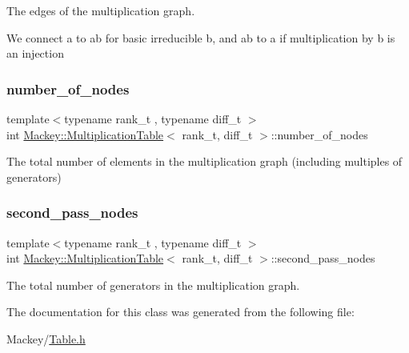 The edges of the multiplication graph. 

We connect a to ab for basic irreducible b, and ab to a if multiplication by b is an injection \mbox{\label{classMackey_1_1MultiplicationTable_a224de8ffa6d10b7d9511880bb8a2260f}} 
\subsubsection{\texorpdfstring{number\+\_\+of\+\_\+nodes}{number\_of\_nodes}}
{\footnotesize\ttfamily template$<$typename rank\+\_\+t , typename diff\+\_\+t $>$ \\
int \hyperlink{classMackey_1_1MultiplicationTable}{Mackey\+::\+Multiplication\+Table}$<$ rank\+\_\+t, diff\+\_\+t $>$\+::number\+\_\+of\+\_\+nodes\hspace{0.3cm}{\ttfamily [protected]}}



The total number of elements in the multiplication graph (including multiples of generators) 

\mbox{\label{classMackey_1_1MultiplicationTable_a0c2fa316e3b79691a73a69e552a52bfc}} 
\subsubsection{\texorpdfstring{second\+\_\+pass\+\_\+nodes}{second\_pass\_nodes}}
{\footnotesize\ttfamily template$<$typename rank\+\_\+t , typename diff\+\_\+t $>$ \\
int \hyperlink{classMackey_1_1MultiplicationTable}{Mackey\+::\+Multiplication\+Table}$<$ rank\+\_\+t, diff\+\_\+t $>$\+::second\+\_\+pass\+\_\+nodes\hspace{0.3cm}{\ttfamily [protected]}}



The total number of generators in the multiplication graph. 



The documentation for this class was generated from the following file\+:\begin{DoxyCompactItemize}
\item 
Mackey/\hyperlink{Table_8h}{Table.\+h}\end{DoxyCompactItemize}
